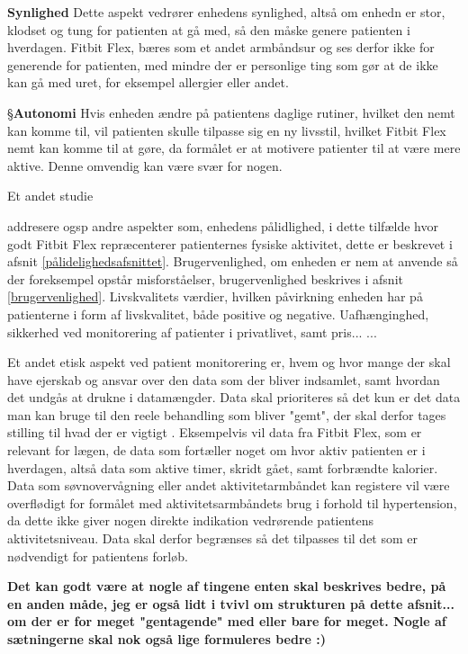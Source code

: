 \textbf{Synlighed}
Dette aspekt vedrører enhedens synlighed, altså om enhedn er stor, klodset og tung for patienten at gå med, så den måske genere patienten i hverdagen. Fitbit Flex, bæres som et andet armbåndsur og ses derfor ikke for generende for patienten, med mindre der er personlige ting som gør at de ikke kan gå med uret, for eksempel allergier eller andet.

§\textbf{Autonomi}
Hvis enheden ændre på patientens daglige rutiner, hvilket den nemt kan komme til, vil patienten skulle tilpasse sig en ny livsstil, hvilket Fitbit Flex nemt kan komme til at gøre, da formålet er at motivere patienter til at være mere aktive. Denne omvendig kan være svær for nogen. 

Et andet studie \author{Nordgren2013} addresere ogsp andre aspekter som, enhedens pålidlighed, i dette tilfælde hvor godt Fitbit Flex repræcenterer patienternes fysiske aktivitet, dette er beskrevet i afsnit \autoref{pålidelighedsafsnittet}. Brugervenlighed, om enheden er nem at anvende så der foreksempel opstår misforståelser, brugervenlighed beskrives i afsnit \autoref{brugervenlighed}. Livskvalitets værdier, hvilken påvirkning enheden har på patienterne i form af livskvalitet, både positive og negative. Uafhænginghed, sikkerhed ved monitorering af patienter i privatlivet, samt pris... \citep{Nordgren2013}...

Et andet etisk aspekt ved patient monitorering er, hvem og hvor mange der skal have ejerskab og ansvar over den data som der bliver indsamlet, samt hvordan det undgås at drukne i datamængder. Data skal prioriteres så det kun er det data man kan bruge til den reele behandling som bliver "gemt", der skal derfor tages stilling til hvad der er vigtigt \citep{patienthome2015}. Eksempelvis vil data fra Fitbit Flex, som er relevant for lægen, de data som fortæller noget om hvor aktiv patienten er i hverdagen, altså data som aktive timer, skridt gået, samt forbrændte kalorier. Data som søvnovervågning eller andet aktivitetarmbåndet kan registere vil være overflødigt for formålet med aktivitetsarmbåndets brug i forhold til hypertension, da dette ikke giver nogen direkte indikation vedrørende patientens aktivitetsniveau. Data skal derfor begrænses så det tilpasses til det som er nødvendigt for patientens forløb. 

\textbf{Det kan godt være at nogle af tingene enten skal beskrives bedre, på en anden måde, jeg er også lidt i tvivl om strukturen på dette afsnit... om der er for meget "gentagende" med eller bare for meget. Nogle af sætningerne skal nok også lige formuleres bedre :) }

